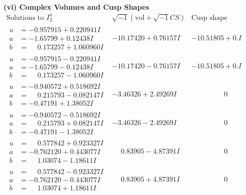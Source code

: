 \documentclass[1p]{elsarticle_modified}
\theoremstyle{definition}
\newcommand{\I}{\sqrt{-1}}
\begin{document}
\newpage\flushleft \textbf{(vi) Complex Volumes and Cusp Shapes}
$$\begin{array}{c|c|c}  
\text{Solutions to }I^u_{2}& \I (\text{vol} + \sqrt{-1}CS) & \text{Cusp shape}\\
 \hline 
\begin{aligned}
u &= -0.957915 + 0.220941 I \\
a &= -1.65799 + 0.12438 I \\
b &= \phantom{-}0.173257 + 1.060960 I\end{aligned}
 & -10.17420 + 0.76157 I & -10.51805 + 0. I\phantom{ +0.000000I} \\ \hline\begin{aligned}
u &= -0.957915 - 0.220941 I \\
a &= -1.65799 - 0.12438 I \\
b &= \phantom{-}0.173257 - 1.060960 I\end{aligned}
 & -10.17420 - 0.76157 I & -10.51805 + 0. I\phantom{ +0.000000I} \\ \hline\begin{aligned}
u &= -0.940572 + 0.518692 I \\
a &= \phantom{-}0.215793 - 0.082147 I \\
b &= -0.47191 + 1.38052 I\end{aligned}
 & -3.46326 + 2.49269 I & \phantom{-0.000000 } 0 \\ \hline\begin{aligned}
u &= -0.940572 - 0.518692 I \\
a &= \phantom{-}0.215793 + 0.082147 I \\
b &= -0.47191 - 1.38052 I\end{aligned}
 & -3.46326 - 2.49269 I & \phantom{-0.000000 } 0 \\ \hline\begin{aligned}
u &= \phantom{-}0.577842 + 0.923327 I \\
a &= -0.762120 + 0.443077 I \\
b &= \phantom{-}1.03074 - 1.18611 I\end{aligned}
 & \phantom{-}0.83905 - 4.87391 I & \phantom{-0.000000 } 0 \\ \hline\begin{aligned}
u &= \phantom{-}0.577842 - 0.923327 I \\
a &= -0.762120 - 0.443077 I \\
b &= \phantom{-}1.03074 + 1.18611 I\end{aligned}
 & \phantom{-}0.83905 + 4.87391 I & \phantom{-0.000000 } 0 \\ \hline\begin{aligned}

\end{aligned}
\end{array}$$
\end{document}
